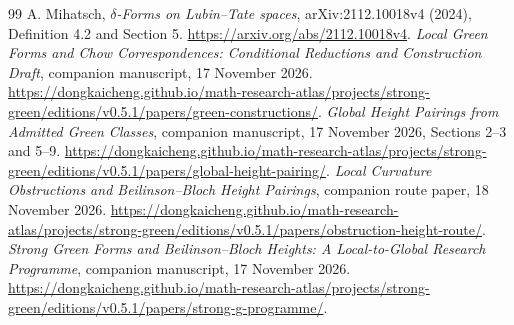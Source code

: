 \documentclass[11pt,a4paper]{article}
\theoremstyle{definition}
\numberwithin{equation}{section}
\begin{document}
\begin{thebibliography}{99}
 A. Mihatsch, \emph{$\delta$-Forms on Lubin--Tate spaces}, arXiv:2112.10018v4 (2024), Definition 4.2 and Section 5. \url{https://arxiv.org/abs/2112.10018v4}.
 \emph{Local Green Forms and Chow Correspondences: Conditional Reductions and Construction Draft}, companion manuscript, 17 November 2026. \url{https://dongkaicheng.github.io/math-research-atlas/projects/strong-green/editions/v0.5.1/papers/green-constructions/}.
 \emph{Global Height Pairings from Admitted Green Classes}, companion manuscript, 17 November 2026, Sections 2--3 and 5--9. \url{https://dongkaicheng.github.io/math-research-atlas/projects/strong-green/editions/v0.5.1/papers/global-height-pairing/}.
 \emph{Local Curvature Obstructions and Beilinson--Bloch Height Pairings}, companion route paper, 18 November 2026. \url{https://dongkaicheng.github.io/math-research-atlas/projects/strong-green/editions/v0.5.1/papers/obstruction-height-route/}.
 \emph{Strong Green Forms and Beilinson--Bloch Heights: A Local-to-Global Research Programme}, companion manuscript, 17 November 2026. \url{https://dongkaicheng.github.io/math-research-atlas/projects/strong-green/editions/v0.5.1/papers/strong-g-programme/}.
\end{thebibliography}
\end{document}
